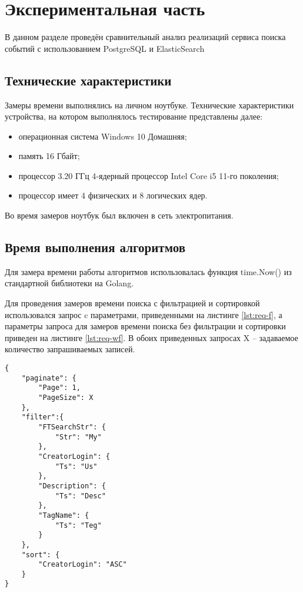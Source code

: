 \section{Экспериментальная часть}

В данном разделе проведён сравнительный анализ реализаций сервиса поиска событий с использованием PostgreSQL и ElasticSearch

\subsection{Технические характеристики}

Замеры времени выполнялись на личном ноутбуке. Технические характеристики устройства, на котором выполнялось тестирование представлены далее:

\begin{itemize}[label=---]
	\item операционная система Windows 10 Домашняя;
	\item память 16 Гбайт;
	\item процессор 3.20 ГГц 4‑ядерный процессор Intel Core i5 11-го поколения;
	\item процессор имеет 4 физических и 8 логических ядер.
\end{itemize}

Во время замеров ноутбук был включен в сеть электропитания.

\subsection{Время выполнения алгоритмов}

Для замера времени работы алгоритмов использовалась функция \linebreak time.Now() из стандартной библиотеки на Golang.

Для проведения замеров времени поиска с фильтрацией и сортировкой использовался запрос c параметрами, приведенными на листинге \ref{lst:req-f}, а параметры запроса для замеров времени поиска без фильтрации и сортировки приведен на листинге \ref{lst:req-wf}. В обоих приведенных запросах X -- задаваемое количество запрашиваемых записей.

\begin{center}
	\captionsetup{justification=raggedright,singlelinecheck=off}
	\begin{lstlisting}[label=lst:req-f,caption=Параметры запроса с указанием фильтрациии и сортировки]
{
	"paginate": {
		"Page": 1,
		"PageSize": X
	},
	"filter":{
		"FTSearchStr": {
			"Str": "My"
		},
		"CreatorLogin": {
			"Ts": "Us"
		},
		"Description": {
			"Ts": "Desc"
		},
		"TagName": {
			"Ts": "Teg"
		}
	},
	"sort": {
		"CreatorLogin": "ASC"
	}
}
	\end{lstlisting}
\end{center}

